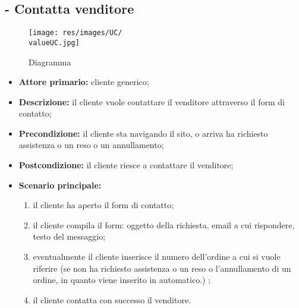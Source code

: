\stepUserCase
\subsection{ - Contatta venditore}
\begin{figure}[H]
    \centering
    \texttt{[image: res/images/UC/\\valueUC.jpg]}
    \caption{Diagramma }
\end{figure}
\begin{itemize}
    \item \textbf{Attore primario:} cliente generico;
    \item \textbf{Descrizione:} il cliente vuole contattare il venditore attraverso il form di contatto;
    \item \textbf{Precondizione:} il cliente sta navigando il sito, o arriva ha richiesto assistenza o un reso o un annullamento;
    \item \textbf{Postcondizione:} il cliente riesce a contattare il venditore;
    \item \textbf{Scenario principale:}
          \begin{enumerate}
              \item il cliente ha aperto il form di contatto;
              \item il cliente compila il form: oggetto della richiesta, email a cui rispondere, testo del messaggio;
              \item eventualmente il cliente inserisce il numero dell'ordine a cui si vuole riferire (se non ha richiesto assistenza o un reso o l'annullamento di un ordine, in quanto viene inserito in automatico.) ;
              \item il cliente contatta con successo il venditore.
          \end{enumerate}
\end{itemize}


\stepUserCase
